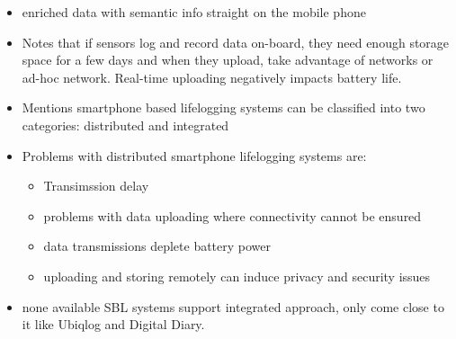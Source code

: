 \begin{itemize}
	\item \citet{rawassizadeh2013ubiqlog} enriched data with semantic info straight on the mobile phone
	\item \citet{gurrin2014lifelogging} Notes that if sensors log and record data on-board, they need enough storage space for a few days and when they upload, take advantage of networks or ad-hoc network. Real-time uploading negatively impacts battery life.
	\item \citet{ali2019insight} Mentions smartphone based lifelogging systems can be classified into two categories: distributed and integrated
		\item \citet{ali2019insight} Problems with distributed smartphone lifelogging systems are:
	\begin{itemize}
		\item Transimssion delay
		\item problems with data uploading where connectivity cannot be ensured
		\item data transmissions deplete battery power
		\item uploading and storing remotely can induce privacy and security issues
	\end{itemize}
	\item \citet{ali2019insight} none available SBL systems support integrated approach, only come close to it like Ubiqlog and Digital Diary.
\end{itemize}

